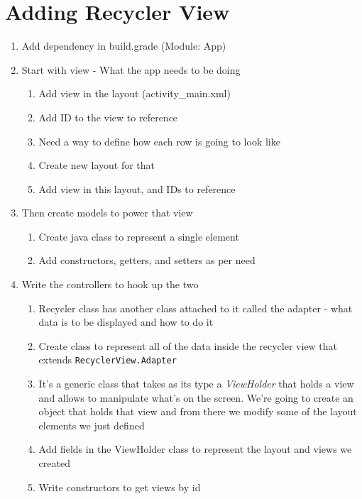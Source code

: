 \section{Adding Recycler View}
\begin{enumerate}
	\item Add dependency in build.grade (Module: App)
	\item Start with view - What the app needs to be doing
	      \begin{enumerate}
		      \item Add view in the layout (activity\_main.xml)
		      \item Add ID to the view to reference
		      \item Need a way to define how each row is going to look
		            like
		      \item Create new layout for that
		      \item Add view in this layout, and IDs to reference
	      \end{enumerate}
	\item Then create models to power that view
	      \begin{enumerate}
		      \item Create java class to represent a single element
		      \item Add constructors, getters, and setters as per need
	      \end{enumerate}
	\item Write the controllers to hook up the two
	      \begin{enumerate}
		      \item Recycler class has another class attached to it
		            called the adapter - what data is to be displayed
		            and how to do it
		      \item Create class to represent all of the data inside
		            the recycler view that extends
		            \texttt{RecyclerView.Adapter}
		      \item It's a generic class that takes as its type a
		            \emph{ViewHolder} that holds a view and allows to
		            manipulate what's on the screen. We're going to create
		            an object that holds that view and from there we
		            modify some of the layout elements we just defined
		      \item Add fields in the ViewHolder class to represent
		            the layout and views we created
		      \item Write constructors to get views by id

\end{enumerate}
\end{enumerate}
